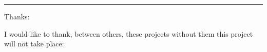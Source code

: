 %
%
%

\newpage
\hrule
\begin{flushright}
{\huge Thanks:}
\end{flushright}
\vspace{1cm}

\noindent
I would like to thank, between others, these projects without them this project will not take place:

